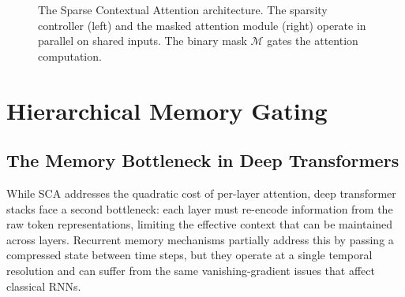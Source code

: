 \documentclass[12pt,a4paper,oneside]{book}
\begin{document}
\begin{figure}[htbp]
  \centering
  \caption{The Sparse Contextual Attention architecture. The sparsity controller
    (left) and the masked attention module (right) operate in parallel on shared
    inputs. The binary mask $\mathcal{M}$ gates the attention computation.}
  \label{fig:sca-architecture}
\end{figure}

\chapter{Hierarchical Memory Gating}
\label{chap:hmg}

\section{The Memory Bottleneck in Deep Transformers}

While SCA addresses the quadratic cost of per-layer attention, deep transformer stacks
face a second bottleneck: each layer must re-encode information from the raw token
representations, limiting the effective context that can be maintained across layers.
Recurrent memory mechanisms \cite{dai2019transformer, rae2019compressive} partially
address this by passing a compressed state between time steps, but they operate at a
single temporal resolution and can suffer from the same vanishing-gradient issues that
affect classical RNNs.
\end{document}
